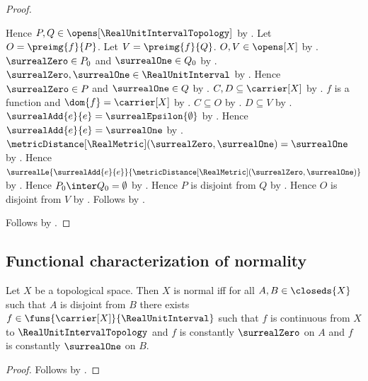 \begin{proof}
\begin{subproof}
        Hence $P,Q\in\opens[\RealUnitIntervalTopology]$
            by .
        Let $O=\preimg{f}{P}$.
        Let $V=\preimg{f}{Q}$.
        $O,V\in\opens[X]$ by .
        $\surrealZero\in P_0$ and $\surrealOne\in Q_0$
            by
            .
        $\surrealZero,\surrealOne\in\RealUnitInterval$
            by
            .
        Hence $\surrealZero\in P$ and $\surrealOne\in Q$
            by .
        $C,D\subseteq\carrier[X]$
            by .
        $f$ is a function and $\dom{f}=\carrier[X]$
            by .
        $C\subseteq O$ by .
        $D\subseteq V$ by .
        $\surrealAdd{e}{e}=\surrealEpsilon{\emptyset}$
            by .
        Hence $\surrealAdd{e}{e}=\surrealOne$
            by .
        $\metricDistance[\RealMetric](\surrealZero,\surrealOne)
            =\surrealOne$
            by .
        Hence
            $\surrealLe{\surrealAdd{e}{e}}
                {\metricDistance[\RealMetric]
                    (\surrealZero,\surrealOne)}$
            by .
        Hence $P_0\inter Q_0=\emptyset$
            by
            .
        Hence $P$ is disjoint from $Q$
            by .
        Hence $O$ is disjoint from $V$
            by .
        Follows by \auto.
    \end{subproof}
    Follows by .
\end{proof}

\subsection{Functional characterization of normality}

\begin{theorem}\label{normal_iff_unit_interval_separation}
    Let $X$ be a topological space.
    Then $X$ is normal iff for all $A,B\in\closeds{X}$ such that
        $A$ is disjoint from $B$ there exists
        $f\in\funs{\carrier[X]}{\RealUnitInterval}$ such that
        $f$ is continuous from $X$ to $\RealUnitIntervalTopology$ and
        $f$ is constantly $\surrealZero$ on $A$ and
        $f$ is constantly $\surrealOne$ on $B$.
\end{theorem}
\begin{proof}
    Follows by .
\end{proof}

